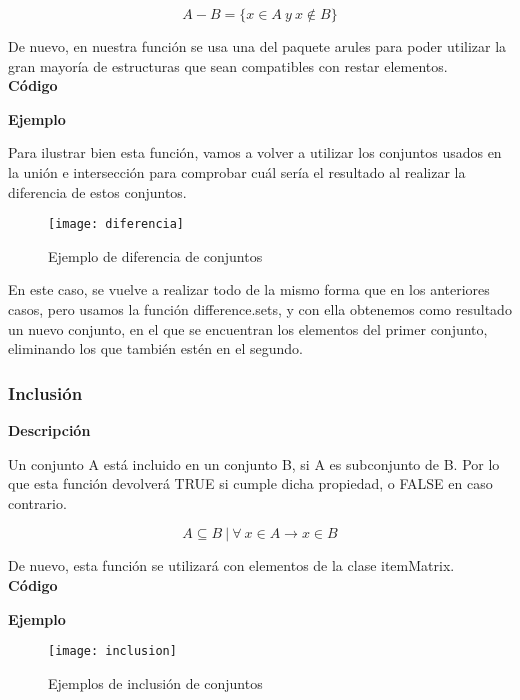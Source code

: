     \[
        A - B = \{x\in A ~ y ~ x\notin B \}
    \]

    De nuevo, en nuestra funci\'on se usa una del paquete arules para poder utilizar la gran mayor\'ia de estructuras 
    que sean compatibles con restar elementos.
    \\


    \textbf{C\'odigo}

    
    \bigskip

    \textbf{Ejemplo}

    Para ilustrar bien esta funci\'on, vamos a volver a utilizar los conjuntos usados en la uni\'on e intersecci\'on para comprobar 
    cu\'al ser\'ia el resultado al realizar la diferencia de estos conjuntos.

    \begin{figure}[H]
        \centering
        \texttt{[image: diferencia]}
        \caption{Ejemplo de diferencia de conjuntos}
        \label{fig:diferencia}
    \end{figure}

    En este caso, se vuelve a realizar todo de la mismo forma que en los anteriores casos, pero usamos la funci\'on difference.sets, y 
    con ella obtenemos como resultado un nuevo conjunto, en el que se encuentran los elementos del primer conjunto, eliminando los que 
    tambi\'en est\'en en el segundo.
    \clearpage


\subsubsection{Inclusi\'on}

    \textbf{Descripci\'on}

    Un conjunto A est\'a incluido en un conjunto B, si A es subconjunto de B. Por lo que esta funci\'on 
    devolver\'a TRUE si cumple dicha propiedad, o FALSE en caso contrario.

    \[
        A \subseteq B ~ | ~  \forall ~ x \in A \to x \in B 
    \]

    De nuevo, esta funci\'on se utilizar\'a con elementos de la clase itemMatrix.
    \\

    \textbf{C\'odigo}

    
    \bigskip

    \textbf{Ejemplo}

    \begin{figure}[H]
        \centering
        \texttt{[image: inclusion]}
        \caption{Ejemplos de inclusi\'on de conjuntos}
        \label{fig:inclusion}
    \end{figure}

